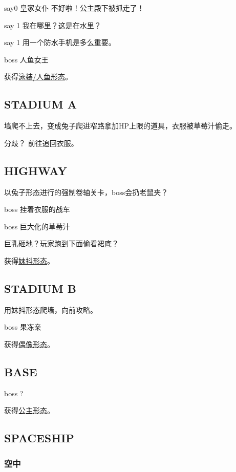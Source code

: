 \documentclass{article}
\begin{document}
say0 皇家女仆 不好啦！公主殿下被抓走了！

say 1 我在哪里？这是在水里？

say 1 用一个防水手机是多么重要。

boss 人鱼女王

获得\hyperref[costume_mermaid]{泳装/人鱼形态}。

\subsection{STADIUM A}

墙爬不上去，变成兔子爬进窄路拿加HP上限的道具，衣服被草莓汁偷走。

分歧？ 前往追回衣服。

\subsection{HIGHWAY}

以兔子形态进行的强制卷轴关卡，boss会扔老鼠夹？

boss 挂着衣服的战车

boss 巨大化的草莓汁

巨乳砸地？玩家跑到下面偷看裙底？

获得\hyperref[costume_maid]{妹抖形态}。

\subsection{STADIUM B}

用妹抖形态爬墙，向前攻略。

boss 果冻亲

获得\hyperref[costume_idol]{偶像形态}。



\subsection{BASE}

boss ?

获得\hyperref[costume_hime]{公主形态}。

\subsection{SPACESHIP}

\subsubsection{空中}
\end{document}
